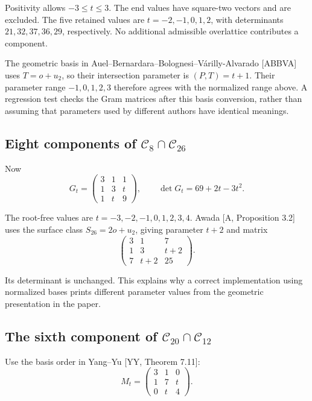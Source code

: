 \documentclass[
  american,
  11pt,
  a4paper,
]{article}
\begin{document}
Positivity allows \(-3\le t\le3\). The end values have square-two
vectors and are excluded. The five retained values are
\(t=-2,-1,0,1,2\), with determinants \(21,32,37,36,29\), respectively.
No additional admissible overlattice contributes a component.

The geometric basis in Auel--Bernardara--Bolognesi--Várilly-Alvarado
{[}ABBVA{]} uses \(T=o+u_2\), so their intersection parameter is
\((P,T)=t+1\). Their parameter range \(-1,0,1,2,3\) therefore agrees
with the normalized range above. A regression test checks the Gram
matrices after this basis conversion, rather than assuming that
parameters used by different authors have identical meanings.

\subsection{\texorpdfstring{Eight components of
\(\mathcal C_8\cap\mathcal C_{26}\)}{Eight components of \textbackslash mathcal C\_8\textbackslash cap\textbackslash mathcal C\_\{26\}}}\label{eight-components-of-mathcal-c_8capmathcal-c_26}

Now
\[G_t=\begin{pmatrix}3&1&1\\1&3&t\\1&t&9\end{pmatrix},
\qquad\det G_t=69+2t-3t^2.\]

The root-free values are \(t=-3,-2,-1,0,1,2,3,4\). Awada {[}A,
Proposition 3.2{]} uses the surface class \(S_{26}=2o+u_2\), giving
parameter \(t+2\) and matrix
\[\begin{pmatrix}3&1&7\\1&3&t+2\\7&t+2&25\end{pmatrix}.\]

Its determinant is unchanged. This explains why a correct implementation
using normalized bases prints different parameter values from the
geometric presentation in the paper.

\subsection{\texorpdfstring{The sixth component of
\(\mathcal C_{20}\cap\mathcal C_{12}\)}{The sixth component of \textbackslash mathcal C\_\{20\}\textbackslash cap\textbackslash mathcal C\_\{12\}}}\label{the-sixth-component-of-mathcal-c_20capmathcal-c_12}

Use the basis order in Yang--Yu {[}YY, Theorem 7.11{]}:
\[M_t=\begin{pmatrix}3&1&0\\1&7&t\\0&t&4\end{pmatrix}.\]
\end{document}
